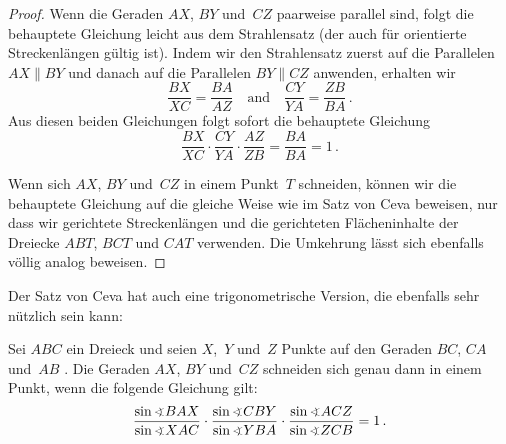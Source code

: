 \begin{proof}
	Wenn die Geraden $AX$, $BY$ und~$CZ$ paarweise parallel sind, folgt die behauptete Gleichung leicht aus dem Strahlensatz (der auch für orientierte Streckenlängen gültig ist). Indem wir den Strahlensatz zuerst auf die Parallelen $AX\parallel BY$ und danach auf die Parallelen $BY\parallel CZ$ anwenden, erhalten wir
	\begin{equation*}
		\frac{BX}{XC}=\frac{BA}{AZ}\quad\text{and}\quad \frac{CY}{YA}=\frac{ZB}{BA}\,.
	\end{equation*}
	Aus diesen beiden Gleichungen folgt sofort die behauptete Gleichung
	\begin{equation*}
		\frac{BX}{XC}\cdot \frac{CY}{YA}\cdot \frac{AZ}{ZB}=\frac{BA}{BA}=1\,.
	\end{equation*}
	
	Wenn sich $AX$, $BY$ und~$CZ$ in einem Punkt~$T$ schneiden, können wir die behauptete Gleichung auf die gleiche Weise wie im Satz von Ceva beweisen, nur dass wir gerichtete Streckenlängen und die gerichteten Flächeninhalte der Dreiecke $ABT$, $BCT$ und $CAT$ verwenden. Die Umkehrung lässt sich ebenfalls völlig analog beweisen.
\end{proof}

Der Satz von Ceva hat auch eine trigonometrische Version, die ebenfalls sehr nützlich sein kann:
\begin{satzmitnamen}
	Sei $ABC$ ein Dreieck und seien $X$,~$Y$ und~$Z$ Punkte auf den Geraden $BC$, $CA$ und~$AB$ . Die Geraden $AX$, $BY$ und~$CZ$ schneiden sich genau dann in einem Punkt, wenn die folgende Gleichung  gilt:
	\begin{equation*}%
		\frac{\sin\winkel BAX}{\sin\winkel XAC}\cdot \frac{\sin \winkel CBY}{\sin\winkel YBA}\cdot \frac{\sin \winkel ACZ}{\sin\winkel ZCB}=1\,.
	\end{equation*}
\end{satzmitnamen}

